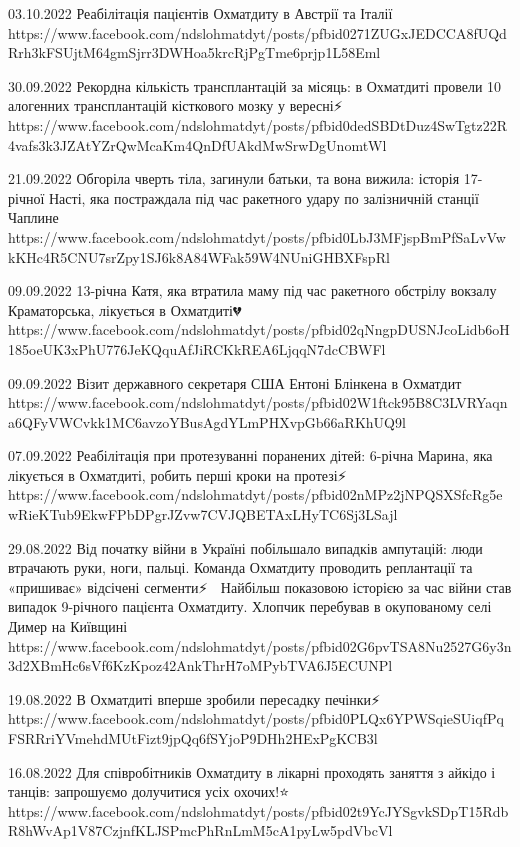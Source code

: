  
 
 
 
 

03.10.2022
Реабілітація пацієнтів Охматдиту в Австрії та Італії
https://www.facebook.com/ndslohmatdyt/posts/pfbid0271ZUGxJEDCCA8fUQdRrh3kFSUjtM64gmSjrr3DWHoa5krcRjPgTme6prjp1L58Eml

30.09.2022
Рекордна кількість трансплантацій за місяць: в Охматдиті провели 10 алогенних трансплантацій кісткового мозку у вересні⚡️
https://www.facebook.com/ndslohmatdyt/posts/pfbid0dedSBDtDuz4SwTgtz22R4vafs3k3JZAtYZrQwMcaKm4QnDfUAkdMwSrwDgUnomtWl

21.09.2022
Обгоріла чверть тіла, загинули батьки, та вона вижила: історія 17-річної Насті, 
яка постраждала під час ракетного удару по залізничній станції Чаплине
https://www.facebook.com/ndslohmatdyt/posts/pfbid0LbJ3MFjspBmPfSaLvVwkKHc4R5CNU7srZpy1SJ6k8A84WFak59W4NUniGHBXFspRl

09.09.2022
13-річна Катя, яка втратила маму під час ракетного обстрілу вокзалу Краматорська, лікується в Охматдиті💔
https://www.facebook.com/ndslohmatdyt/posts/pfbid02qNngpDUSNJcoLidb6oH185oeUK3xPhU776JeKQquAfJiRCKkREA6LjqqN7dcCBWFl

09.09.2022
Візит державного секретаря США Ентоні Блінкена в Охматдит
https://www.facebook.com/ndslohmatdyt/posts/pfbid02W1ftck95B8C3LVRYaqna6QFyVWCvkk1MC6avzoYBusAgdYLmPHXvpGb66aRKhUQ9l

07.09.2022
Реабілітація при протезуванні поранених дітей: 6-річна Марина, яка лікується в Охматдиті, робить перші кроки на протезі⚡️
https://www.facebook.com/ndslohmatdyt/posts/pfbid02nMPz2jNPQSXSfcRg5ewRieKTub9EkwFPbDPgrJZvw7CVJQBETAxLHyTC6Sj3LSajl

29.08.2022
Від початку війни в Україні побільшало випадків ампутацій: люди втрачають руки, ноги, пальці. Команда Охматдиту проводить реплантації та «пришиває» відсічені сегменти⚡️
🔹 Найбільш показовою історією за час війни став випадок 9-річного пацієнта Охматдиту. Хлопчик перебував в окупованому селі Димер на Київщині
https://www.facebook.com/ndslohmatdyt/posts/pfbid02G6pvTSA8Nu2527G6y3n3d2XBmHc6sVf6KzKpoz42AnkThrH7oMPybTVA6J5ECUNPl


19.08.2022
В Охматдиті вперше зробили пересадку печінки⚡️
https://www.facebook.com/ndslohmatdyt/posts/pfbid0PLQx6YPWSqieSUiqfPqFSRRriYVmehdMUtFizt9jpQq6fSYjoP9DHh2HExPgKCB3l

16.08.2022
Для співробітників Охматдиту в лікарні проходять заняття з айкідо і танців: запрошуємо долучитися усіх охочих!⭐️
https://www.facebook.com/ndslohmatdyt/posts/pfbid02t9YcJYSgvkSDpT15RdbR8hWvAp1V87CzjnfKLJSPmcPhRnLmM5cA1pyLw5pdVbcVl
